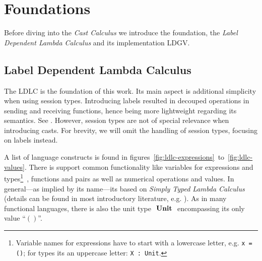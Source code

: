 \newcommand{\letb}{\text{ \textbf{let} }}
\newcommand{\inb}{\text{ \textbf{in} }}
\newcommand{\rec}{\text{ \textbf{rec} }}
\newcommand{\natrec}{\text{ \textbf{natrec} }}
\newcommand{\fstb}{\text{ \textbf{fst} }}
\newcommand{\sndb}{\text{ \textbf{snd} }}

\newcommand{\Unit}{\text{ \textbf{Unit} }}
\newcommand{\Nat}{\text{ \textbf{Nat} }}
\newcommand{\Double}{\text{ \textbf{Double} }}
\newcommand{\Bot}{\text{ \textbf{Bot} }}

\newcommand{\valb}{\text{ \textbf{val} }}
\newcommand{\typeb}{\text{ \textbf{type} }}

\chapter{Foundations}\label{chap:foundations}

Before diving into the \emph{Cast Calculus} we introduce the foundation, the \emph{Label Dependent Lambda Calculus} and its implementation LDGV.

\section{Label Dependent Lambda Calculus}\label{sec:ldlc}

The LDLC is the foundation of this work. Its main aspect is additional simplicity when using session types. Introducing labels resulted in decouped operations in sending and receiving functions, hence being more lightweight regarding its semantics. See \cite{thiemann2019}. However, session types are not of special relevance when introducing casts. For brevity, we will omit the handling of session types, focusing on labels instead.

A list of language constructs is found in figures~\ref{fig:ldlc-expressions}~to~\ref{fig:ldlc-values}. There is support common functionality like variables  for expressions and types\footnote{
Variable names for expressions have to start with a lowercase letter, e.g. \texttt{\valb x = ()}; for types its an uppercase letter: \texttt{\typeb X : Unit}.}\
, functions and pairs as well as numerical operations and values. In general---as implied by its name---its based on \emph{Simply Typed Lambda Calculus} (details can be found in most introductory literature, e.g. \cite{pierce2002}). As in many functional languages, there is also the unit type $\Unit$ encompassing its only value ``$()$''.

